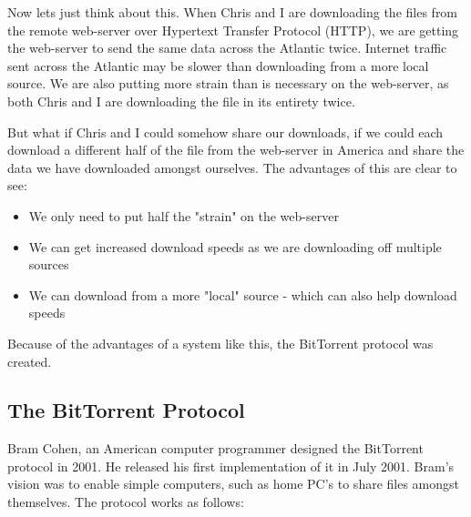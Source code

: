 Now lets just think about this. When Chris and I are downloading the files from the remote web-server over Hypertext Transfer Protocol (HTTP), we are getting the web-server to send the same data across the Atlantic twice. Internet traffic sent across the Atlantic may be slower than downloading from a more local source. We are also putting more strain than is necessary on the web-server, as both Chris and I are downloading the file in its entirety twice. 

But what if Chris and I could somehow share our downloads, if we could each download a different half of the file from the web-server in America and share the data we have downloaded amongst ourselves. The advantages of this are clear to see: 

\begin{itemize}
\item We only need to put half the "strain" on the web-server
\item We can get increased download speeds as we are downloading off multiple sources
\item We can download from a more "local" source - which can also help download speeds
\end{itemize}

Because of the advantages of a system like this, the BitTorrent protocol was created.

\subsection{The BitTorrent Protocol}
Bram Cohen, an American computer programmer designed the BitTorrent protocol in 2001. He released his first implementation of it in July 2001\cite{Reference4}. Bram's vision was to enable simple computers, such as home PC's to share files amongst themselves. The protocol works as follows:

